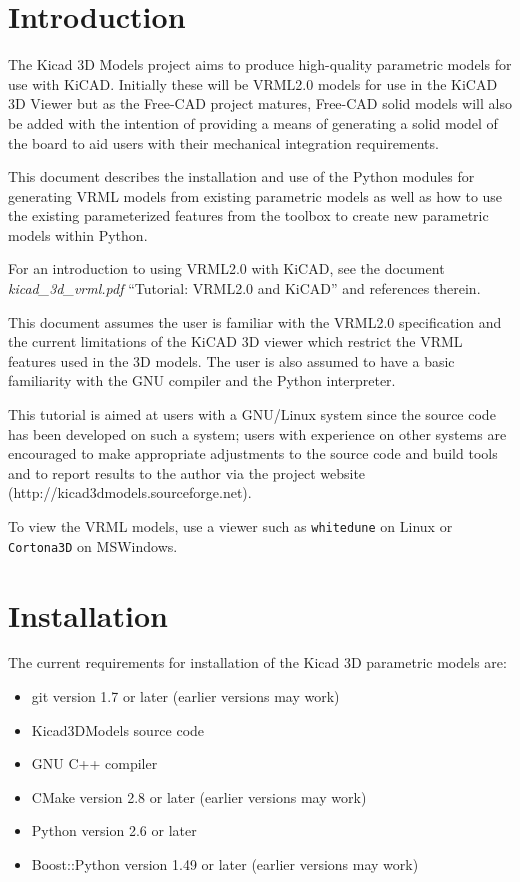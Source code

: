 \section{Introduction}
The Kicad 3D Models project aims to produce high-quality parametric models for use
with KiCAD.  Initially these will be VRML2.0 models for use in the KiCAD 3D Viewer
but as the Free-CAD project matures, Free-CAD solid models will also be added with
the intention of providing a means of generating a solid model of the board to aid
users with their mechanical integration requirements.

This document describes the installation and use of the Python modules for generating
VRML models from existing parametric models as well as how to use the existing
parameterized features from the toolbox to create new parametric models within Python.

For an introduction to using VRML2.0 with KiCAD, see the document \emph{kicad\_3d\_vrml.pdf}
``Tutorial: VRML2.0 and KiCAD'' and references therein.

This document assumes the user is familiar with the VRML2.0 specification and the
current limitations of the KiCAD 3D viewer which restrict the VRML features used
in the 3D models. The user is also assumed to have a basic familiarity with
the GNU compiler and the Python interpreter.

This tutorial is aimed at users with a GNU/Linux system since the source code has
been developed on such a system; users with experience on other systems are
encouraged to make appropriate adjustments to the source code and build tools and
to report results to the author via the project website (http://kicad3dmodels.sourceforge.net).

To view the VRML models, use a viewer such as \verb#whitedune# on Linux or \verb#Cortona3D#
on MSWindows.

\section{Installation}
The current requirements for installation of the Kicad 3D parametric models are:
\begin{itemize}
\item git version 1.7 or later (earlier versions may work)\\
\item Kicad3DModels source code\\
\item GNU C++ compiler\\
\item CMake version 2.8 or later (earlier versions may work)\\
\item Python version 2.6 or later\\
\item Boost::Python version 1.49 or later (earlier versions may work)\\
\end{itemize}

